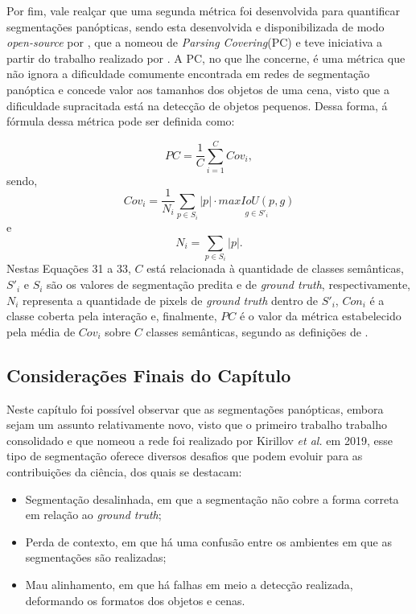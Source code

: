 Por fim, vale realçar que uma segunda métrica foi desenvolvida para quantificar segmentações panópticas, sendo esta desenvolvida e disponibilizada de modo \textit{open-source} por \cite{Yang2019}, que a nomeou de \textit{Parsing Covering}(PC) e teve iniciativa a partir do trabalho realizado por \cite{Arbelaez2011}. A PC, no que lhe concerne, é uma métrica que não ignora a dificuldade comumente encontrada em redes de segmentação panóptica e concede valor aos tamanhos dos objetos de uma cena, visto que a dificuldade supracitada está na detecção de objetos pequenos. Dessa forma, á fórmula dessa métrica pode ser definida como:

\begin{equation}
    \label{panoptic:eq:3}
    PC = \frac{1}{C} \underset{i=1}{\overset{C}{\sum}}Cov_i,
\end{equation}
sendo,
\begin{equation}
    \label{panoptic:eq:4}
    Cov_i = \frac{1}{N_i}\underset{p \in S_i}{\sum} |p|\cdot \underset{g \in S'_i}{max IoU(p,g)}
\end{equation}
e
\begin{equation}
    \label{panoptic:eq:5}
    N_i = \underset{p \in S_i}{\sum} |p|.
\end{equation}
Nestas Equações 31 a 33, $C$ está relacionada à quantidade de classes semânticas, $S'_i$ e $S_i$ são os valores de segmentação predita e de \textit{ground truth}, respectivamente, $N_i$ representa a quantidade de pixels de \textit{ground truth} dentro de $S'_i$, $Con_i$ é a classe coberta pela interação e, finalmente, $PC$ é o valor da métrica estabelecido pela média de $Cov_i$ sobre $C$ classes semânticas, segundo as definições de \cite{Yang2019}.


\subsection{Considerações Finais do Capítulo}
\label{panoptic:conclusion}
 Neste capítulo foi possível observar que as segmentações panópticas, embora sejam um assunto relativamente novo, visto que o primeiro trabalho trabalho consolidado e que nomeou a rede foi realizado por Kirillov \textit{et al.} \cite{Kirillov2019a} em 2019, esse tipo de segmentação oferece diversos desafios que podem evoluir para as contribuições da ciência, dos quais se destacam:
 
 \begin{itemize}
     \item Segmentação desalinhada, em que a segmentação não cobre a forma correta em relação ao \textit{ground truth};
     \item Perda de contexto, em que há uma confusão entre os ambientes em que as segmentações são realizadas;
     \item Mau alinhamento, em que há falhas em meio a detecção realizada, deformando os formatos dos objetos e cenas.
 \end{itemize}

